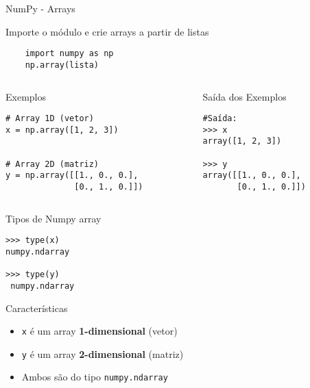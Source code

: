 \begin{frame}[fragile]{NumPy - Arrays}

    \begin{block}{Importe o módulo e crie arrays a partir de listas}

        \begin{verbatim}
    import numpy as np
    np.array(lista)
    \end{verbatim}

    \end{block}
    \begin{columns}[T]
        \begin{column}{0.5\textwidth}
            \begin{exampleblock}{Exemplos}
                \begin{verbatim}
# Array 1D (vetor)
x = np.array([1, 2, 3])


# Array 2D (matriz)
y = np.array([[1., 0., 0.], 
              [0., 1., 0.]])

\end{verbatim}
            \end{exampleblock}
        \end{column}

        \begin{column}{0.5\textwidth}
            \begin{block}{Saída dos Exemplos}
                \begin{verbatim}
#Saída:
>>> x
array([1, 2, 3])

>>> y
array([[1., 0., 0.],
       [0., 1., 0.]])
 \end{verbatim}
            \end{block}
        \end{column}
    \end{columns}
\end{frame}

\begin{frame}[fragile]{Tipos de Numpy array}
    \begin{verbatim}
>>> type(x)
numpy.ndarray

>>> type(y)
 numpy.ndarray
\end{verbatim}

    \begin{block}{Características}
        \begin{itemize}
            \item \texttt{x} é um array \textbf{1-dimensional} (vetor)
            \item \texttt{y} é um array \textbf{2-dimensional} (matriz)
            \item Ambos são do tipo \texttt{numpy.ndarray}
        \end{itemize}
    \end{block}
\end{frame}

